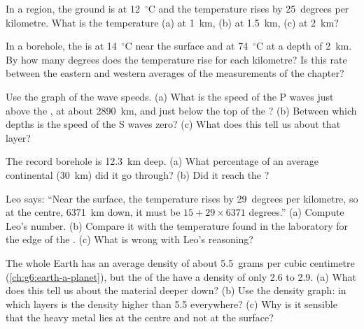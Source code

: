 \begin{exercise}[$\star\star$]\label{exo:g6:inside-the-earth:7}
In a region, the ground is at 12~$^\circ$C and the temperature rises by
25~degrees per kilometre. What is the temperature (a) at 1~km, (b) at
1.5~km, (c) at 2~km?
\end{exercise}

\begin{exercise}[$\star\star$]\label{exo:g6:inside-the-earth:8}
In a borehole, the  is at 14~$^\circ$C near the surface and at
74~$^\circ$C at a depth of 2~km. By how many degrees does the temperature
rise for each kilometre? Is this rate between the eastern and western
averages of the measurements of the chapter?
\end{exercise}

\begin{exercise}[$\star\star$]\label{exo:g6:inside-the-earth:9}
Use the graph of the wave speeds. (a) What is the speed of the P waves just
above the , at about 2890~km, and just below the top of the ?
(b) Between which depths is the speed of the S waves zero? (c) What does
this tell us about that layer?
\end{exercise}

\begin{exercise}[$\star\star$]\label{exo:g6:inside-the-earth:10}
The record borehole is 12.3~km deep. (a) What percentage of an average
continental  (30~km) did it go through? (b) Did it reach the ?
\end{exercise}

\begin{exercise}[$\star\star\star$]\label{exo:g6:inside-the-earth:11}
Leo says: ``Near the surface, the temperature rises by 29~degrees per
kilometre, so at the centre, 6371~km down, it must be
$15 + 29 \times 6371$ degrees.'' (a) Compute Leo's number. (b) Compare it
with the temperature found in the laboratory for the edge of the . (c) What is wrong with Leo's reasoning?
\end{exercise}

\begin{exercise}[$\star\star\star$]\label{exo:g6:inside-the-earth:12}
The whole Earth has an average density of about 5.5~grams per cubic
centimetre (\cref{ch:g6:earth-a-planet}), but the  of the  have a
density of only 2.6 to 2.9. (a) What does this tell us about the material
deeper down? (b) Use the density graph: in which layers is the density higher than 5.5 everywhere? (c) Why is it sensible that the heavy metal lies at the
centre and not at the surface?
\end{exercise}

